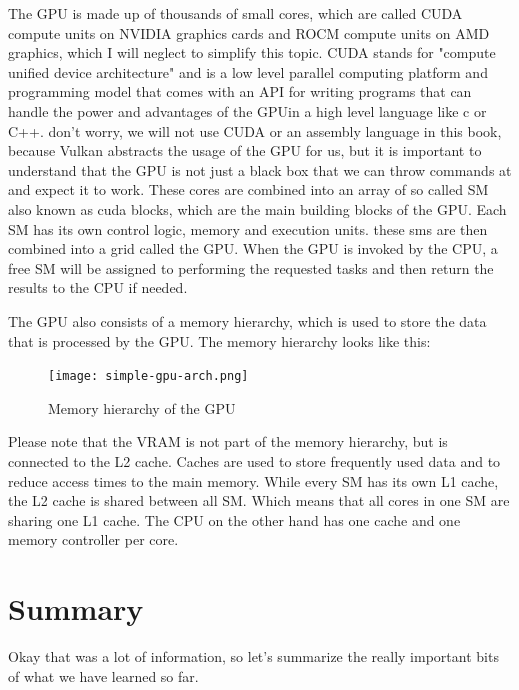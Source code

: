 \documentclass[12pt]{report} \usepackage{preamble}
\begin{document}
The \ac{GPU} is made up of thousands of small cores, which are called CUDA
compute units on NVIDIA graphics cards \cite{CUDA_Programming_Guide}
and ROCM compute units on AMD graphics, which I will neglect to
simplify this topic. \cite{rocm} CUDA stands for "compute unified
device architecture" and is a low level parallel computing platform
and programming model that comes with an \ac{API} for writing programs
that can handle the power and advantages of the \ac{GPU}in a high level
language like c or C++. \cite{CUDA_Programming_Guide} don't worry, we
will not use CUDA or an assembly language in this book, because Vulkan
abstracts the usage of the \ac{GPU} for us, but it is important to understand
that the \ac{GPU} is not just a black box that we can throw commands at and
expect it to work. These cores are combined into an array of so called
\ac{SM} also known as cuda blocks, which are the
main building blocks of the \ac{GPU}.  Each \ac{SM} has its own control logic,
memory and execution units. \cite{CUDA_Programming_Guide} these sms are
then combined into a grid called the \ac{GPU}.  When the \ac{GPU} is invoked by
the \ac{CPU}, a free \ac{SM} will be assigned to performing the requested tasks
and then return the results to the \ac{CPU} if needed. \cite{CUDA_Programming_Guide}

The \ac{GPU} also consists of a memory hierarchy, which is used to store the
data that is processed by the \ac{GPU}. The memory hierarchy looks like this:

\begin{figure}[hbtp]
	\centering
	\texttt{[image: simple-gpu-arch.png]}
	\caption{Memory hierarchy of the \ac{GPU} \cite{fig:gpu-arch}}
\end{figure}

Please note that the VRAM is not part of the memory hierarchy, but is
connected to the L2 cache. Caches are used to store frequently used
data and to reduce access times to the main memory. While every \ac{SM}
has its own L1 cache, the L2 cache is shared between all \ac{SM}. Which
means that all cores in one \ac{SM} are sharing one L1 cache. The \ac{CPU}
on the other hand has one cache and one memory controller per
core. \cite{CUDA_Programming_Guide}

\section {Summary}

Okay that was a lot of information, so let's summarize the really
important bits of what we have learned so far.
\end{document}
